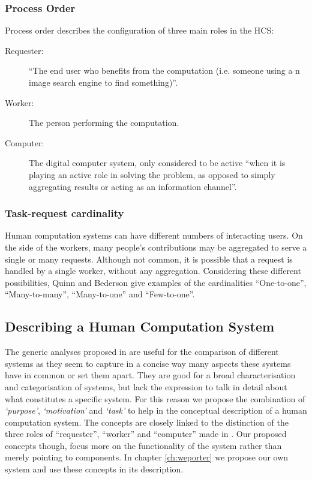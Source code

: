 \subsubsection{Process Order}
Process order describes the configuration of three main roles in the HCS\cite{Quinn:2011us}:

\begin{description}
  \item[Requester:] ``The end user who benefits from the computation (i.e. someone using a n image search engine to find something)''.
  \item[Worker:] The person performing the computation.
  \item[Computer:] The digital computer system, only considered to be active ``when it is playing an active role in solving the problem, as opposed to simply aggregating results or acting as an information channel''.
\end{description}


\subsubsection{Task-request cardinality}
Human computation systems can have different numbers of interacting users. On the side of the workers, many people's contributions may be aggregated to serve a single or many requests. Although not common, it is possible that a request is handled by a single worker, without any aggregation. Considering these different possibilities, Quinn and Bederson give examples of the cardinalities 
``One-to-one'', ``Many-to-many'', ``Many-to-one'' and ``Few-to-one''.


\subsection{Describing a Human Computation System} %
\label{sub:describing_hcs}

The generic analyses proposed in \cite{Quinn:2011us} are useful for the comparison of different systems as they seem to capture in a concise way many aspects these systems have in common or set them apart. They are good for a broad characterisation and categorisation of systems, but lack the expression to talk in detail about what constitutes a specific system. For this reason we propose the  combination of \emph{`purpose'}, \emph{`motivation'} and \emph{`task'} to help in the conceptual description of a human computation system. The concepts are closely linked to the distinction of the three roles of ``requester'', ``worker'' and ``computer'' made in \cite{Quinn:2011us}. Our proposed concepts though, focus more on the functionality of the system rather than merely pointing to components. In chapter \ref{ch:weporter} we propose our own system and use these concepts in its description.

